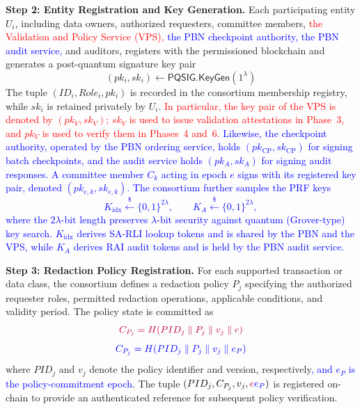 \documentclass[lettersize,journal]{IEEEtran}
\begin{document}
\textbf{Step 2: Entity Registration and Key Generation.}
Each participating entity $U_i$, including data owners, authorized
requesters, committee members, \textcolor{red}{the Validation and Policy
Service (VPS),} \textcolor{blue}{the PBN checkpoint authority, the PBN
audit service,} and auditors, registers with the
permissioned blockchain and generates a post-quantum signature key pair
\begin{equation}
(pk_i,sk_i)\leftarrow
\mathsf{PQSIG.KeyGen}(1^\lambda)
\end{equation}
The tuple $(ID_i,Role_i,pk_i)$ is recorded in the consortium
membership registry, while $sk_i$ is retained privately by $U_i$.
\textcolor{red}{In particular, the key pair of the VPS is denoted by
$(pk_V,sk_V)$; $sk_V$ is used to issue validation attestations in
Phase~3, and $pk_V$ is used to verify them in Phases~4 and~6.}
\textcolor{blue}{Likewise, the checkpoint authority, operated by the PBN
ordering service, holds $(pk_{\mathrm{CP}},sk_{\mathrm{CP}})$ for signing
batch checkpoints, and the audit service holds $(pk_A,sk_A)$ for signing
audit responses. A committee member $C_k$ acting in epoch $e$ signs with
its registered key pair, denoted $(pk_{e,k},sk_{e,k})$. The consortium
further samples the PRF keys
\begin{equation}
K_{\mathrm{idx}}\stackrel{\$}{\leftarrow}\{0,1\}^{2\lambda},\qquad
K_A\stackrel{\$}{\leftarrow}\{0,1\}^{2\lambda},
\end{equation}
where the $2\lambda$-bit length preserves $\lambda$-bit security against
quantum (Grover-type) key search. $K_{\mathrm{idx}}$ derives SA-RLI lookup
tokens and is shared by the PBN and the VPS, while $K_A$ derives RAI audit
tokens and is held by the PBN audit service.}

\textbf{Step 3: Redaction Policy Registration.}
For each supported transaction or data class, the consortium defines
a redaction policy $P_j$ specifying the authorized requester roles,
permitted redaction operations, applicable conditions, and validity
period. The policy state is committed as
\begin{equation}
{\color{purple}C_{P_j}=H(PID_j\parallel P_j\parallel v_j\parallel e)}
\end{equation}
\begin{equation}
{\color{blue}C_{P_j}=H(PID_j\parallel P_j\parallel v_j\parallel e_P)}
\end{equation}
where $PID_j$ and $v_j$ denote the policy identifier and version,
respectively\textcolor{blue}{, and $e_P$ is the policy-commitment epoch}. The tuple $(PID_j,C_{P_j},v_j,\textcolor{purple}{e}\textcolor{blue}{e_P})$ is registered on-chain
to provide an authenticated reference for subsequent policy
verification.
\end{document}
